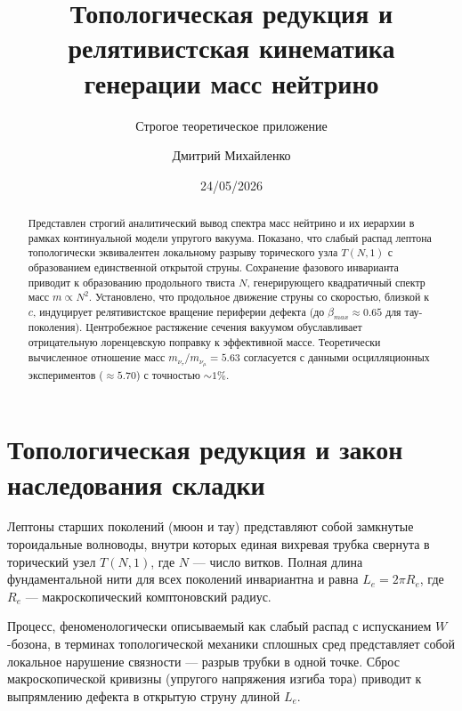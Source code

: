 \documentclass[12pt,a4paper]{article}
\begin{document}
\title{\textbf{Топологическая редукция и релятивистская кинематика генерации масс нейтрино}}
\author{Строгое теоретическое приложение}
\author{Дмитрий Михайленко}
\date{24/05/2026}
\maketitle

\begin{abstract}
Представлен строгий аналитический вывод спектра масс нейтрино и их иерархии в рамках континуальной модели упругого вакуума. Показано, что слабый распад лептона топологически эквивалентен локальному разрыву торического узла $T(N,1)$ с образованием единственной открытой струны. Сохранение фазового инварианта приводит к образованию продольного твиста $N$, генерирующего квадратичный спектр масс $m \propto N^2$. Установлено, что продольное движение струны со скоростью, близкой к $c$, индуцирует релятивистское вращение периферии дефекта (до $\beta_{max} \approx 0.65$ для тау-поколения). Центробежное растяжение сечения вакуумом обуславливает отрицательную лоренцевскую поправку к эффективной массе. Теоретически вычисленное отношение масс $m_{\nu_\tau} / m_{\nu_\mu} = 5.63$ согласуется с данными осцилляционных экспериментов ($\approx 5.70$) с точностью $\sim 1\%$.
\end{abstract}

\section{Топологическая редукция и закон наследования складки}

Лептоны старших поколений (мюон и тау) представляют собой замкнутые тороидальные волноводы, внутри которых единая вихревая трубка свернута в торический узел $T(N,1)$, где $N$ — число витков. Полная длина фундаментальной нити для всех поколений инвариантна и равна $L_e = 2\pi R_e$, где $R_e$ — макроскопический комптоновский радиус.

Процесс, феноменологически описываемый как слабый распад с испусканием $W$-бозона, в терминах топологической механики сплошных сред представляет собой локальное нарушение связности — разрыв трубки в одной точке. Сброс макроскопической кривизны (упругого напряжения изгиба тора) приводит к выпрямлению дефекта в открытую струну длиной $L_e$.
\end{document}
